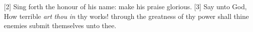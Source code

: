 [2] \textcolor[cmyk]{0.99998,1,0,0}{Sing forth the honour of his name: make his praise glorious.}
[3] \textcolor[cmyk]{0.99998,1,0,0}{Say unto God, How terrible \emph{art} \emph{thou} \emph{in} thy works! through the greatness of thy power shall thine enemies submit themselves unto thee.} %
